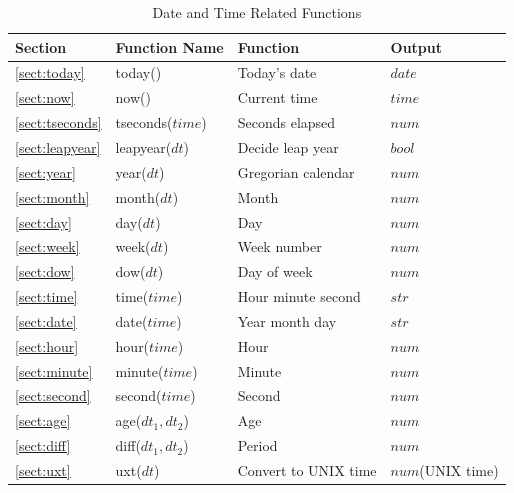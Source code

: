 \begin{table}[!hb]
\begin{center}
\caption{Date and Time Related Functions\label{tbl:mcal_date}}
{\small
  \begin{tabular}{l|l|l|l} \hline
Section&Function Name&Function&Output\\ \hline

\ref{sect:today}& today()&
Today’s date&$date$\\

\ref{sect:now}& now()&
Current time&$time$\\

\ref{sect:tseconds}& tseconds($time$)&
Seconds elapsed &$num$\\

\ref{sect:leapyear}& leapyear($dt$)&
Decide leap year&$bool$\\

\ref{sect:year}& year($dt$)&
Gregorian calendar &$num$\\

\ref{sect:month}& month($dt$)&
Month&$num$\\

\ref{sect:day}& day($dt$)&
Day&$num$\\

\ref{sect:week}& week($dt$)&
Week number&$num$\\

\ref{sect:dow}& dow($dt$)&
Day of week&$num$\\

\ref{sect:time}& time($time$)&
Hour minute second&$str$\\

\ref{sect:date}& date($time$)&
Year month day&$str$\\

\ref{sect:hour}& hour($time$)&
Hour&$num$\\

\ref{sect:minute}& minute($time$)&
Minute&$num$\\

\ref{sect:second}& second($time$)&
Second&$num$\\

\ref{sect:age}& age($dt_1,dt_2$)&
Age&$num$\\

\ref{sect:diff}& diff($dt_1,dt_2$)&
Period&$num$\\

\ref{sect:uxt}& uxt($dt$)&
Convert to UNIX time&$num$(UNIX time)\\


\end{tabular}}
\end{center}
\end{table}
